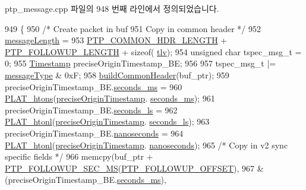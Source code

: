 ptp\+\_\+message.\+cpp 파일의 948 번째 라인에서 정의되었습니다.


\begin{DoxyCode}
949 \{
950     \textcolor{comment}{/* Create packet in buf}
951 \textcolor{comment}{    Copy in common header */}
952     \hyperlink{class_p_t_p_message_common_a6c490faee54bca860c4d897aae50990f}{messageLength} =
953         \hyperlink{avbts__message_8hpp_a8ec4d965b7b1e83844f1c17f12e9b8e4}{PTP\_COMMON\_HDR\_LENGTH} + \hyperlink{avbts__message_8hpp_a7db8f880133691145b633e681fea9d27}{PTP\_FOLLOWUP\_LENGTH} + \textcolor{keyword}{sizeof}(
      \hyperlink{class_p_t_p_message_follow_up_adb3aa00a5c7072f30af7374ea54c158c}{tlv});
954     \textcolor{keywordtype}{unsigned} \textcolor{keywordtype}{char} tspec\_msg\_t = 0;
955     \hyperlink{class_timestamp}{Timestamp} preciseOriginTimestamp\_BE;
956 
957     tspec\_msg\_t |= \hyperlink{class_p_t_p_message_common_adb32627aa5b0e2dbad3ccd88aab07c05}{messageType} & 0xF;
958     \hyperlink{class_p_t_p_message_common_a66c6d7a38fc74d84b68e13216c82a4e6}{buildCommonHeader}(buf\_ptr);
959     preciseOriginTimestamp\_BE.\hyperlink{class_timestamp_a5d98378d782519e6f9c17db70f1620f0}{seconds\_ms} =
960         \hyperlink{linux_2src_2platform_8cpp_aa89fc0aa7465274c200da69771d2a043}{PLAT\_htons}(\hyperlink{class_p_t_p_message_follow_up_ab410646215c0bcbaf124d5923f22e2ca}{preciseOriginTimestamp}.
      \hyperlink{class_timestamp_a5d98378d782519e6f9c17db70f1620f0}{seconds\_ms});
961     preciseOriginTimestamp\_BE.\hyperlink{class_timestamp_a2bf200e58cd268d8b86cf93c51500a44}{seconds\_ls} =
962         \hyperlink{linux_2src_2platform_8cpp_a8bf9e45ac3e41441f0e139139241c19d}{PLAT\_htonl}(\hyperlink{class_p_t_p_message_follow_up_ab410646215c0bcbaf124d5923f22e2ca}{preciseOriginTimestamp}.
      \hyperlink{class_timestamp_a2bf200e58cd268d8b86cf93c51500a44}{seconds\_ls});
963     preciseOriginTimestamp\_BE.\hyperlink{class_timestamp_a78ae11d98fcfe738239d0a853d82c84a}{nanoseconds} =
964         \hyperlink{linux_2src_2platform_8cpp_a8bf9e45ac3e41441f0e139139241c19d}{PLAT\_htonl}(\hyperlink{class_p_t_p_message_follow_up_ab410646215c0bcbaf124d5923f22e2ca}{preciseOriginTimestamp}.
      \hyperlink{class_timestamp_a78ae11d98fcfe738239d0a853d82c84a}{nanoseconds});
965     \textcolor{comment}{/* Copy in v2 sync specific fields */}
966     memcpy(buf\_ptr + \hyperlink{avbts__message_8hpp_a8bc5c60f52c4f491a6e86c43ec5ddc66}{PTP\_FOLLOWUP\_SEC\_MS}(\hyperlink{avbts__message_8hpp_af54dd338e8c2b906b028746fbecdb74d}{PTP\_FOLLOWUP\_OFFSET}),
967         &(preciseOriginTimestamp\_BE.\hyperlink{class_timestamp_a5d98378d782519e6f9c17db70f1620f0}{seconds\_ms}),

\end{DoxyCode}
